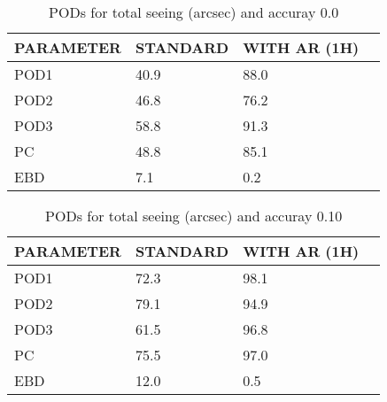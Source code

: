 \documentclass[11pt,english]{article}
\begin{document}
\newpage

\clearpage
\begin{table}[]
\begin{center}
\begin{tabular}{|l|l|l|l|}
\hline
\multicolumn{1}{|c|}{\cellcolor[HTML]{C0C0C0}\textbf{PARAMETER}} & \multicolumn{1}{c|}{\cellcolor[HTML]{C0C0C0}\textbf{STANDARD}} & \multicolumn{1}{c|}{\cellcolor[HTML]{C0C0C0}\textbf{WITH AR (1H)}} \\
\hline
\cellcolor[HTML]{C0C0C0}POD1  & 40.9                                & 88.0         \\
\cellcolor[HTML]{C0C0C0}POD2  & 46.8                                & 76.2         \\
\cellcolor[HTML]{C0C0C0}POD3  & 58.8                                & 91.3         \\
\cellcolor[HTML]{C0C0C0}PC    & 48.8                                  & 85.1           \\
\cellcolor[HTML]{C0C0C0}EBD   & 7.1                                 & 0.2          \\
\hline
\end{tabular}
\caption{PODs for total seeing (arcsec) and accuray 0.0}
\end{center}
\end{table}
\begin{table}[]
\begin{center}
\begin{tabular}{|l|l|l|l|}
\hline
\multicolumn{1}{|c|}{\cellcolor[HTML]{C0C0C0}\textbf{PARAMETER}} & \multicolumn{1}{c|}{\cellcolor[HTML]{C0C0C0}\textbf{STANDARD}} & \multicolumn{1}{c|}{\cellcolor[HTML]{C0C0C0}\textbf{WITH AR (1H)}} \\
\hline
\cellcolor[HTML]{C0C0C0}POD1  & 72.3                                & 98.1         \\
\cellcolor[HTML]{C0C0C0}POD2  & 79.1                                & 94.9         \\
\cellcolor[HTML]{C0C0C0}POD3  & 61.5                                & 96.8         \\
\cellcolor[HTML]{C0C0C0}PC    & 75.5                                  & 97.0           \\
\cellcolor[HTML]{C0C0C0}EBD   & 12.0                                 & 0.5          \\
\hline
\end{tabular}
\caption{PODs for total seeing (arcsec) and accuray 0.10}
\end{center}
\end{table}
\end{document}
